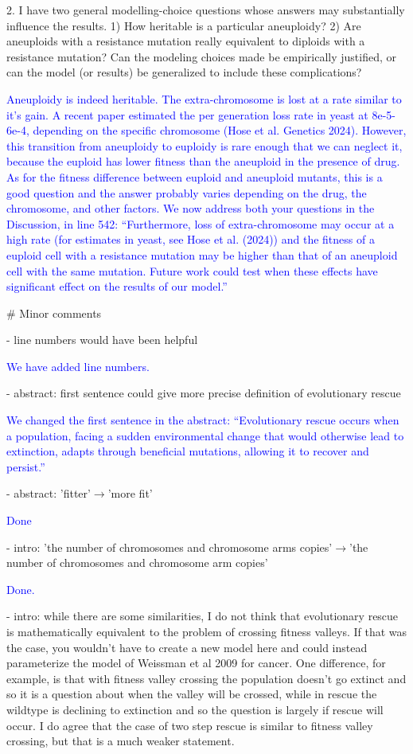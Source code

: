\documentclass[12pt]{extarticle}
\begin{document}
2. I have two general modelling-choice questions whose answers may substantially influence the results. 1) How heritable is a particular aneuploidy?  2) Are aneuploids with a resistance mutation really equivalent to diploids with a resistance mutation? Can the modeling choices made be empirically justified, or can the model (or results) be generalized to include these complications?

\textcolor{blue}{%
Aneuploidy is indeed heritable. The extra-chromosome is lost at a rate similar to it's gain. A recent paper estimated the per generation loss rate in yeast at 8e-5-6e-4, depending on the specific chromosome (Hose et al. Genetics 2024). However, this transition from aneuploidy to euploidy is rare enough that we can neglect it, because the euploid has lower fitness than the aneuploid in the presence of drug.
As for the fitness difference between euploid and aneuploid mutants, this is a good question and the answer probably varies depending on the drug, the chromosome, and other factors. We now address both your questions in the Discussion, in line 542: ``Furthermore, loss of extra-chromosome may occur at a high rate (for estimates in yeast, see Hose et al. (2024)) and the fitness of a euploid cell with a resistance mutation may be higher than that of an aneuploid cell with the same mutation. Future work could test when these effects have significant effect on the results of our model.''
} 

$\#$ Minor comments

- line numbers would have been helpful

\textcolor{blue}{We have added line numbers.} 

- abstract: first sentence could give more precise definition of evolutionary rescue

\textcolor{blue}{%
We changed the first sentence in the abstract: ``Evolutionary rescue occurs when a population, facing a sudden environmental change that would otherwise lead to extinction, adapts through beneficial mutations, allowing it to recover and persist.''
} 

- abstract: 'fitter'$\rightarrow$'more fit'

\textcolor{blue}{Done} %

- intro: 'the number of chromosomes and chromosome arms copies'$\rightarrow$'the number of chromosomes and chromosome arm copies'

\textcolor{blue}{Done.}%

- intro: while there are some similarities, I do not think that evolutionary rescue is mathematically equivalent to the problem of crossing fitness valleys. If that was the case, you wouldn't have to create a new model here and could instead parameterize the model of Weissman et al 2009 for cancer. One difference, for example, is that with fitness valley crossing the population doesn't go extinct and so it is a question about when the valley will be crossed, while in rescue the wildtype is declining to extinction and so the question is largely if rescue will occur. I do agree that the case of two step rescue is similar to fitness valley crossing, but that is a much weaker statement.
\end{document}

